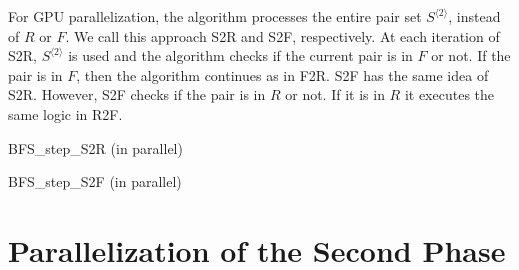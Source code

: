 For GPU parallelization, the algorithm processes the entire pair set $S^{\langle 2 \rangle}$, instead of $R$ or $F$. We call this approach S2R and S2F, respectively. At each iteration of S2R, $S^{\langle 2 \rangle}$ is used and the algorithm checks if the current pair is in $F$ or not. If the pair is in $F$, then the algorithm continues as in F2R. S2F has the same idea of S2R. However, S2F checks if the pair is in $R$ or not. If it is in $R$ it executes the same logic in R2F. 

\begin{algorithm}[ht]
	\label{algo:BFS-step-S2R-Parallel}
	\caption{BFS\_step\_S2R (in parallel)}
	
	
	{
	}
	
\end{algorithm}

\begin{algorithm}[ht]
	\label{algo:BFS-step-S2F-Parallel}
	\caption{BFS\_step\_S2F (in parallel)}
	
	
		{
		}
\end{algorithm}


\section{Parallelization of the Second Phase}
\label{sec:second-phase-parallelization}


